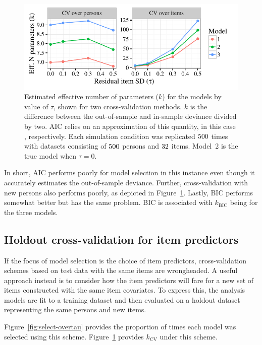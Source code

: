\documentclass[12pt, letterpaper]{article}
\begin{document}
\begin{figure}[tbp]
	\centering
	\includegraphics{chapter_2/figs/k_overtau.pdf}
	\caption{Estimated effective number of parameters ($k$) for the models by value of $\tau$, shown for two cross-validation methods. $k$ is the difference between the out-of-sample and in-sample deviance divided by two. AIC relies on an approximation of this quantity, in this case \aic[and], respectively. Each simulation condition was replicated $500$ times with datasets consisting of $500$ persons and $32$ items. Model~2 is the true model when $\tau = 0$.}
	\label{fig:k-overtau}
\end{figure}

In short, AIC performs poorly for model selection in this instance even though it accurately estimates the out-of-sample deviance. Further, cross-validation with new persons also performs poorly, as depicted in Figure~\ref{fig:k-overtau}. Lastly, BIC performs somewhat better but has the same problem. BIC is associated with $k_\mathrm{BIC}$ being \bic[and] for the three models. 


\subsection{Holdout cross-validation for item predictors}

If the focus of model selection is the choice of item predictors, cross-validation schemes based on test data with the same items are wrongheaded. A useful approach instead is to consider how the item predictors will fare for a new set of items constructed with the same item covariates. To express this, the analysis models are fit to a training dataset and then evaluated on a holdout dataset representing the same persons and new items. 

Figure~\ref{fig:select-overtau} provides the proportion of times each model was selected using this scheme. 
Figure~\ref{fig:k-overtau} provides $k_\mathrm{CV}$ under this scheme.
\end{document}
